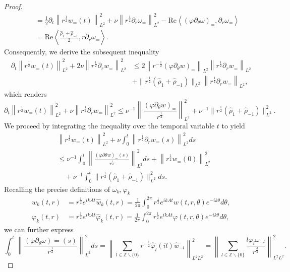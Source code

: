 \documentclass[final, 12pt,reqno]{amsart}
\numberwithin{equation}{section}
\begin{document}
\begin{proof}
$$\begin{aligned}
& \quad=\frac{1}{2} \partial_t\left\|r^{\frac{1}{2}} w_=(t)\right\|_{L^2}^2+\nu\left\|r^{\frac{1}{2}} \partial_r \omega_=\right\|_{L^2}^2-\text{Re}\left\langle\left(\varphi \partial_\theta \omega\right)_=, \partial_r \omega_=\right\rangle\\
&\quad= \text{Re}\left\langle\frac{\hat{\rho}_{1}+\hat{\rho}_{-1}}{2},r \partial_r\omega_=\right\rangle.
\end{aligned}
$$
Consequently, we derive the subsequent inequality
$$
\begin{aligned}
    \partial_t\left\|r^{\frac{1}{2}}w_=(t)\right\|_{L^2}^2+2 \nu\left\|r^{\frac{1}{2}} \partial_r w_=\right\|_{L^2}^2
    &\leq 2\left\|r^{-\frac{1}{2}}(\varphi \partial_\theta w)_=\right\|_{L^2}\left\|r^{\frac{1}{2}} \partial_r w_=\right\|_{L^2}\\
    &+\|r^{\frac{1}{2}}(\hat{\rho}_{1}+\hat{\rho}_{-1})\|_{L^2}\left\|r^{\frac{1}{2}} \partial_r w_=\right\|_{L^2},
\end{aligned}
$$
which renders
$$
\partial_t\left\|r^{\frac{1}{2}} w_=(t)\right\|_{L^2}^2+\nu\left\|r^{\frac{1}{2}} \partial_r w_=\right\|_{L^2}^2 \leq \nu^{-1}\left\|\frac{\left(\varphi \partial_\theta w\right)_=}{r^{\frac{1}{2}}}\right\|_{L^2}^2+ \nu^{-1}\|r^{\frac{1}{2}}(\hat{\rho}_{1}+\hat{\rho}_{-1})\|_{L^2}^2.
$$
We proceed by integrating the inequality over the temporal variable
$t$ to yield
$$
\begin{aligned}
&\left\|r^{\frac{1}{2}} w_=(t)\right\|_{L^2}^2+\nu \int_0^t\left\|r^{\frac{1}{2}} \partial_r w_=(s)\right\|_{L^2}^2 d s \\
&\leq \nu^{-1} \int_0^t\left\|\frac{(\varphi \partial \theta w)_=(s)}{r^{\frac{1}{2}}}\right\|_{L^2}^2 d s+\left\|r^{\frac{1}{2}} w_=(0)\right\|_{L^2}^2\\
&\quad+\nu^{-1}\int_0^t \|r^{\frac{1}{2}}(\hat{\rho}_{1}+\hat{\rho}_{-1})\|_{L^2}^2ds.
\end{aligned}
$$
Recalling the precise definitions of  $\omega_k, \varphi_k$
$$
\begin{aligned}
w_k(t, r) & =r^{\frac{1}{2}} e^{i k A t} \hat{w}_k(t, r)=\frac{1}{2 \pi} \int_0^{2 \pi} r^{\frac{1}{2}} e^{i k A t} w(t, r, \theta) e^{-i k \theta} d \theta, \\
\varphi_k(t, r) & =r^{\frac{1}{2}} e^{i k A t} \hat{\varphi}_k(t, r)=\frac{1}{2 \pi} \int_0^{2 \pi} r^{\frac{1}{2}} e^{i k A t} \varphi(t, r, \theta) e^{-i k \theta} d \theta,
\end{aligned}
$$
we can further express
$$
\int_0^t\left\|\frac{\left(\varphi \partial_\theta \omega\right)=(s)}{r^{\frac{1}{2}}}\right\|_{L^2}^2 d s=\left\|\sum_{l \in \mathbb{Z} \backslash\{0\}} r^{-\frac{1}{2}} \hat{\varphi}_l(i l) \hat{w}_{-l}\right\|_{L^2 L^2}^2=\left\|\sum_{l \in \mathbb{Z} \backslash\{0\}} \frac{l \varphi_l \omega_{-l}}{r^{\frac{3}{2}}}\right\|_{L^2 L^2}^2 .
$$
\end{proof}
\end{document}
